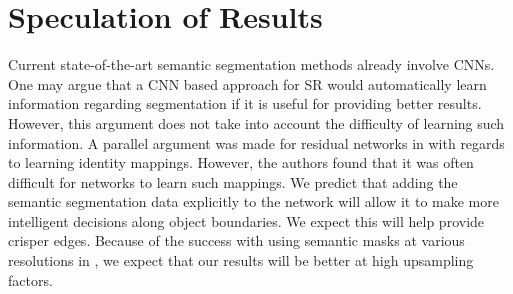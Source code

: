 \documentclass[10pt,twocolumn,letterpaper]{article}
\begin{document}

\section{Speculation of Results}
Current state-of-the-art semantic segmentation methods already involve CNNs.
One may argue that a CNN based approach for SR would automatically learn
information regarding segmentation if it is useful for providing better
results. However, this argument does not take into account the difficulty of
learning such information. A parallel argument was made for residual networks
in \cite{ResNet} with regards to learning identity mappings. However, the
authors found that it was often difficult for networks to learn such mappings.
We predict that adding the semantic segmentation data explicitly to the network
will allow it to make more intelligent decisions along object boundaries. We
expect this will help provide crisper edges. Because of the success with using
semantic masks at various resolutions in \cite{ImageSynthesis}, we expect that
our results will be better at high upsampling factors.

{\small


}
\end{document}
